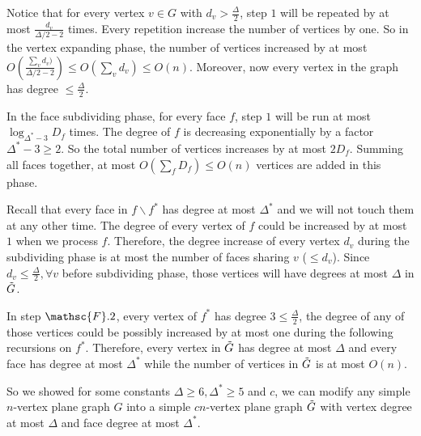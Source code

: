 \documentclass[11pt]{article}
\begin{document}
\begin{solution}
Notice that for every vertex \(v\in G\) with \(d_v>\frac{\Delta}{2}\), step \(1\) will be repeated by at most \(\frac{d_v}{\Delta/2-2}\) times. Every repetition increase the number of vertices by one. So in the vertex expanding phase, the number of vertices increased by at most \(O(\frac{\sum_{v}d_v)}{\Delta/2-2})\le O(\sum_{v}d_v)\le O(n)\). Moreover, now every vertex in the graph has degree \(\le \frac{\Delta}{2}.\)

In the face subdividing phase, for every face \(f\), step \(1\) will be run at most \(\log_{\Delta^*-3}D_f\) times.
The degree of \(f\) is decreasing exponentially by a factor \(\Delta^*-3\ge 2\).
So the total number of vertices increases by at most \(2D_f\).
Summing all faces together, at most \(O(\sum_fD_f)\le O(n)\) vertices are added in this phase.

Recall that every face in \(f\backslash f^*\) has degree at most \(\Delta^*\) and we will not touch them at any other time.
The degree of every vertex of \(f\) could be increased by at most \(1\) when we process \(f\).
Therefore, the degree increase of every vertex \(d_v\) during the subdividing phase is at most the number of faces sharing \(v\) (\(\le d_v\)).
Since \(d_v\le \frac{\Delta}{2}, \forall v\) before subdividing phase, those vertices will have degrees at most \(\Delta\) in \(\Tilde{G}\).

In step \(\mathsc{F}.2\), every vertex of \(f^*\) has degree \(3\le \frac{\Delta}{2}\), the degree of any of those vertices could be possibly increased by at most one during the following recursions on \(f^*\). Therefore, every vertex in \(\Tilde{G}\) has degree at most \(\Delta\) and every face has degree at most \(\Delta^*\) while the number of vertices in \(\Tilde{G}\) is at most \(O(n)\).

So we showed for some constants \(\Delta\ge 6, \Delta^*\ge 5\) and \(c\), we can modify any simple \(n\)-vertex plane graph \(G\) into a simple \(cn\)-vertex plane graph \(\Tilde{G}\) with vertex degree at most \(\Delta\) and face degree at most \(\Delta^*\).
\end{solution}
\end{document}
